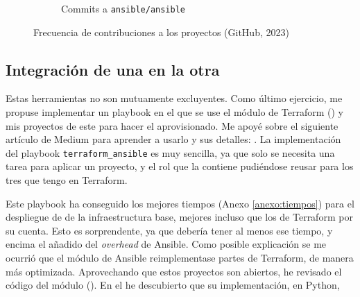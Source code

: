 \documentclass[11pt]{article}
\begin{document}
\begin{flushleft}
\begin{figure}[htb]
        \begin{subfigure}{0.85\textwidth}
            \caption{Commits a \texttt{ansible/ansible}}
        \end{subfigure}
        \caption{Frecuencia de contribuciones a los proyectos (GitHub, 2023)}
        \vspace{-3cm}
    \end{figure} 
    
    
\clearpage
\subsection{Integración de una en la otra}
Estas herramientas no son mutuamente excluyentes. Como último ejercicio, me propuse implementar un playbook en el que se use el módulo de Terraform (\cite{terraform_ansible}) y mis proyectos de este para hacer el aprovisionado. Me apoyé sobre el siguiente artículo de Medium para aprender a usarlo y sus detalles: \cite{terraform_ansible_medium}. La implementación del playbook \texttt{terraform\_ansible} es muy sencilla, ya que solo se necesita una tarea para aplicar un proyecto, y el rol que la contiene pudiéndose reusar para los tres que tengo en Terraform.
\linebreak

\bigskip
        
        \begin{minipage}{.46\textwidth}
            Este playbook ha conseguido los mejores tiempos (Anexo \ref{anexo:tiempos}) para el despliegue de de la infraestructura base, mejores incluso que los de Terraform por su cuenta. Esto es sorprendente, ya que debería tener al menos ese tiempo, y encima el añadido del \textit{\gls{overhead}} de Ansible. Como posible explicación se me ocurrió que el módulo de Ansible reimplementase partes de Terraform, de manera más optimizada. Aprovechando que estos proyectos son abiertos, he revisado el código del módulo (\cite{terraform_ansible_module}). En el he descubierto que su implementación, en Python,
            \linebreak
            

\end{minipage}
\end{flushleft}
\end{document}
